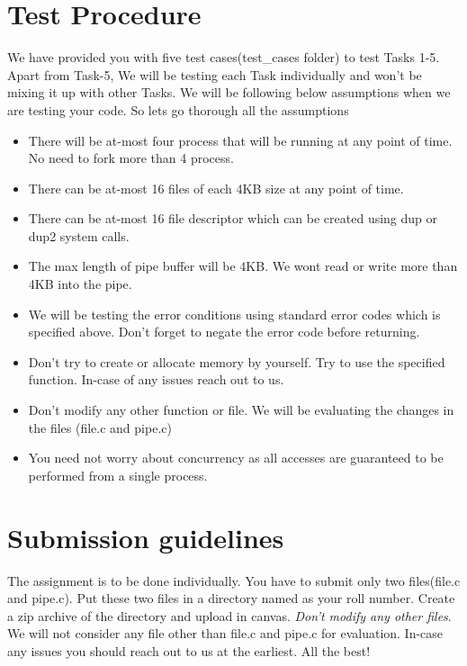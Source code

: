 \documentclass[12pt]{article}
\begin{document}
\section*{Test Procedure}
We have provided you with five test cases(test\_cases folder) to test Tasks 1-5. Apart from Task-5, We will be testing each Task individually and won't be mixing it up with other Tasks. We will be following below assumptions when we are testing your code. So lets go thorough all the assumptions
    \begin{itemize}
        \item There will be at-most four process that will be running at any point of time. No need to fork more than 4 process.
        \item There can be at-most 16 files of each 4KB size at any point of time.
        \item There can be at-most 16 file descriptor which can be created using dup or dup2 system calls.
        \item The max length of pipe buffer will be 4KB. We wont read or write more than 4KB into the pipe.
        \item We will be testing the error conditions using standard error codes which is specified above. Don't forget to negate the error code before returning.
        \item Don't try to create or allocate memory by yourself. Try to use the specified function. In-case of any issues reach out to us.
        \item Don't modify any other function or file. We will be evaluating the changes in the files (file.c and pipe.c)
        \item You need not worry about concurrency as all accesses are guaranteed to be performed from a single process.    
    \end{itemize}{}

\section*{Submission guidelines}
The assignment is to be done individually. You have to submit only two files(file.c and pipe.c). 
Put these two files in a directory named as your roll number. Create a zip archive of the directory and upload in canvas.
{\em Don't modify any other files}. We will not consider any file other than file.c and pipe.c for evaluation. 
In-case any issues you should reach out to us at the earliest.  All the best!
\end{document}
